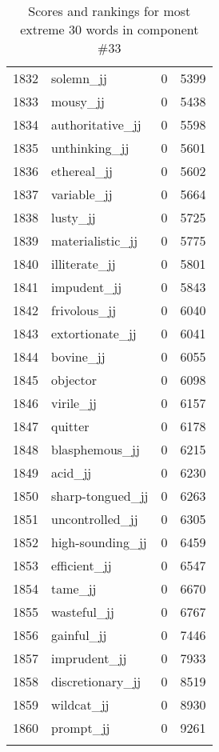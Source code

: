 \begin{longtable}[!htbp]{| rlr@{.}l |}
    1832 & solemn\_jj & 0 & 5399 \\
    1833 & mousy\_jj & 0 & 5438 \\
    1834 & authoritative\_jj & 0 & 5598 \\
    1835 & unthinking\_jj & 0 & 5601 \\
    1836 & ethereal\_jj & 0 & 5602 \\
    1837 & variable\_jj & 0 & 5664 \\
    1838 & lusty\_jj & 0 & 5725 \\
    1839 & materialistic\_jj & 0 & 5775 \\
    1840 & illiterate\_jj & 0 & 5801 \\
    1841 & impudent\_jj & 0 & 5843 \\
    1842 & frivolous\_jj & 0 & 6040 \\
    1843 & extortionate\_jj & 0 & 6041 \\
    1844 & bovine\_jj & 0 & 6055 \\
    1845 & objector & 0 & 6098 \\
    1846 & virile\_jj & 0 & 6157 \\
    1847 & quitter & 0 & 6178 \\
    1848 & blasphemous\_jj & 0 & 6215 \\
    1849 & acid\_jj & 0 & 6230 \\
    1850 & sharp-tongued\_jj & 0 & 6263 \\
    1851 & uncontrolled\_jj & 0 & 6305 \\
    1852 & high-sounding\_jj & 0 & 6459 \\
    1853 & efficient\_jj & 0 & 6547 \\
    1854 & tame\_jj & 0 & 6670 \\
    1855 & wasteful\_jj & 0 & 6767 \\
    1856 & gainful\_jj & 0 & 7446 \\
    1857 & imprudent\_jj & 0 & 7933 \\
    1858 & discretionary\_jj & 0 & 8519 \\
    1859 & wildcat\_jj & 0 & 8930 \\
    1860 & prompt\_jj & 0 & 9261 \\
    \hline
    \caption{Scores and rankings for most extreme 30 words in component \#33} \\
\end{longtable}
